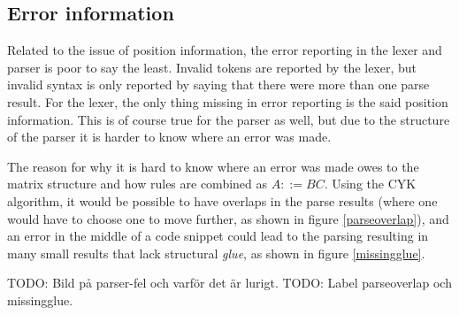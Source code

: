 \documentclass[a4paper,12pt,twosided]{report}
\begin{document}
\subsection{Error information}
Related to the issue of position information, the error reporting in the lexer
and parser is poor to say the least. Invalid tokens are reported by the lexer,
but invalid syntax is only reported by saying that there were more than one
parse result. For the lexer, the only thing missing in error reporting is the
said position information. This is of course true for the parser as well, but
due to the structure of the parser it is harder to know where an error was made.

The reason for why it is hard to know where an error was made owes to the matrix
structure and how rules are combined as $A ::= BC$. Using the CYK algorithm, it
would be possible to have overlaps in the parse results (where one would have to
choose one to move further, as shown in figure \ref{parseoverlap}), and an error
in the middle of a code snippet could lead to the parsing resulting in many
small results that lack structural \textit{glue}, as shown in figure
\ref{missingglue}. 

TODO: Bild på parser-fel och varför det är lurigt. 
TODO: Label parseoverlap och missingglue.

%
%




%
%
\end{document}
